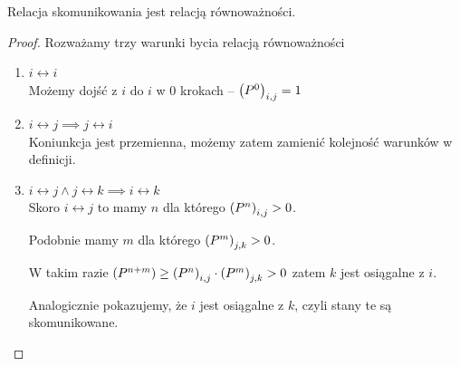 \begin{lemma}
    Relacja skomunikowania jest relacją równoważności.
\end{lemma}
\begin{proof} Rozważamy trzy warunki bycia relacją równoważności
    \begin{enumerate}
        \item \( i \leftrightarrow i \) \\
            Możemy dojść z \( i \) do \( i \) w 0 krokach -- \( \left(P^0\right)_{i, j} = 1 \)
        
        \item \( i \leftrightarrow j \implies j \leftrightarrow i \) \\
            Koniunkcja jest przemienna, możemy zatem zamienić kolejność warunków w definicji.
        
        \item \( i \leftrightarrow j \land j \leftrightarrow k \implies i \leftrightarrow k \) \\
            Skoro \( i \leftrightarrow j \) to mamy \( n \) dla którego \(\left(P^n\right)_{i, j} > 0\).
            
            Podobnie mamy \( m \) dla którego \( \left(P^m\right)_{j, k} > 0 \).
            
            W takim razie \( \left(P^{n+m}\right) \geq \left(P^n\right)_{i, j} \cdot \left(P^m\right)_{j, k} > 0 \)
            zatem \( k \) jest osiągalne z \( i \).
            
            Analogicznie pokazujemy, że \( i \) jest osiągalne z \( k \), czyli stany te są skomunikowane.
            
    \end{enumerate}
\end{proof}

